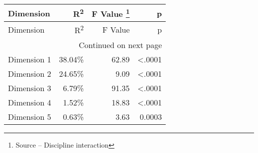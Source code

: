\begin{longtable}{lrrr}
\toprule
Dimension & R\textsuperscript{2} & F Value \footnote{Source -- Discipline interaction} & p \\
\midrule
\endfirsthead
\toprule
Dimension & R\textsuperscript{2} & F Value & p \\
\midrule
\endhead
\midrule
\multicolumn{4}{r}{Continued on next page} \\
\midrule
\endfoot
\bottomrule
\endlastfoot
Dimension 1 & 38.04\% & 62.89 & <.0001 \\
Dimension 2 & 24.65\% & 9.09 & <.0001 \\
Dimension 3 & 6.79\% & 91.35 & <.0001 \\
Dimension 4 & 1.52\% & 18.83 & <.0001 \\
Dimension 5 & 0.63\% & 3.63 & 0.0003 \\
\end{longtable}
